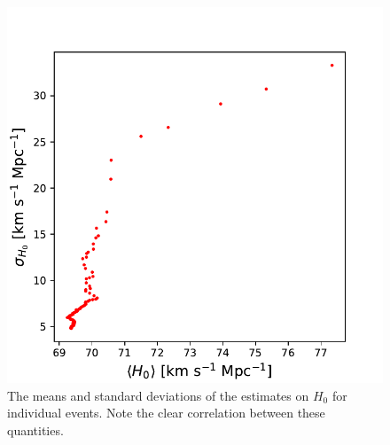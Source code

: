 \begin{figure}
    \centering
    \includegraphics[width=0.95\columnwidth]{figures/correlation.pdf}
    \caption{The means and standard deviations of the estimates on $H_0$ for individual events. Note the clear correlation between these quantities.}
    \label{fig:correlation}
\end{figure}
